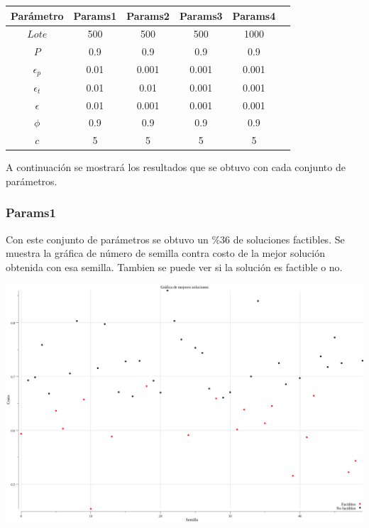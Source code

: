 \documentclass[12pt]{article}
\begin{document}
\begin{center}
  \begin{tabular}{ |c||c|c|c|c|c| } 
    \hline
    Parámetro & Params1 & Params2 & Params3 & Params4 \\ [0.5ex] 
    \hline\hline
    $Lote$ & 500 & 500 & 500 & 1000  \\\hline 
    $P$ & 0.9 & 0.9 & 0.9 & 0.9 \\ \hline 
    $\epsilon_p$ & 0.01 & 0.001 & 0.001 & 0.001 \\ \hline 
    $\epsilon_t$ & 0.01 & 0.01 & 0.001 & 0.001 \\ \hline 
    $\epsilon$ & 0.01 & 0.001 & 0.001 & 0.001 \\ \hline 
    $\phi$ & 0.9 & 0.9 & 0.9 & 0.9 \\ \hline 
    $c$ & 5 & 5 & 5 & 5 \\ 
    \hline
  \end{tabular}
\end{center}

A continuación se mostrará los resultados que se obtuvo con cada conjunto de parámetros.

\newpage

\subsubsection*{Params1}
Con este conjunto de parámetros se obtuvo un $\%$36 de soluciones factibles. Se muestra la gráfica de número de semilla contra costo de la mejor solución obtenida con esa semilla. Tambien se puede ver si la solución es factible o no. \\

\begin{center}
  \includegraphics[scale=0.25]{../archivos/graficas/mejores-soluciones/soluciones1.png} \\
\end{center}
  
\end{document}

